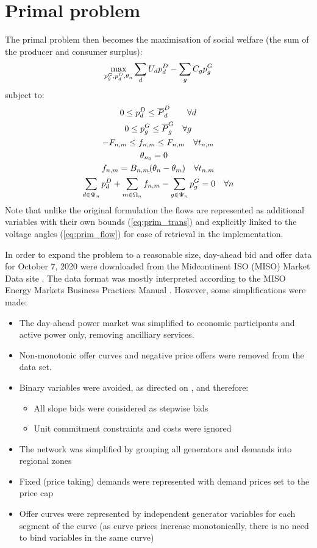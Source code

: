 \documentclass[11pt,a4paper]{article}
\numberwithin{equation}{section}
\begin{document}
\section{Primal problem}
\label{sec:primal}

The primal problem then becomes the maximisation of social welfare (the sum of the producer and consumer surplus):
\begin{equation}
\max_{p^G_g,p^D_d,\theta_n} \sum_d U_d p^D_d - \sum_g C_g p^G_g 
\end{equation}
subject to:
\begin{gather}
0 \leq p^D_d \leq \overline{P}^D_d \quad \quad \forall d \label{eq:prim_demand} \\
0 \leq p^G_g \leq \overline{P}^G_g \quad \forall g \label{eq:prim_supply} \\
-F_{n,m}  \leq f_{n,m} \leq F_{n,m} \quad \forall t_{n,m} \label{eq:prim_trans}\\
\theta_{n_0} = 0 \quad \label{eq:prim_ref_theta} \\
f_{n,m} = B_{n,m}(\theta_n - \theta_m) \quad \forall t_{n,m} \label{eq:prim_flow} \\
\sum_{d \in \Psi_n} p^D_d + \sum_{m \in \Omega_n} f_{n,m} - \sum_{g \in \Psi_n} p^G_g = 0 \quad \forall n \label{eq:prim_balance}
\end{gather}
Note that unlike the original formulation the flows are represented as additional variables with their own bounds (\cref{eq:prim_trans}) and explicitly linked to the voltage angles (\cref{eq:prim_flow}) for ease of retrieval in the implementation.

In order to expand the problem to a reasonable size, day-ahead bid and offer data for October 7, 2020 were downloaded from the Midcontinent ISO (MISO) Market Data site \cite{MISOMarketData}.
The data format was mostly interpreted according to the MISO Energy Markets Business Practices Manual \cite{MISOEnergyOperating2020}. However, some simplifications were made:
\begin{itemize}
\item The day-ahead power market was simplified to economic participants and active power only, removing ancilliary services.
\item Non-monotonic offer curves and negative price offers were removed from the data set.
\item Binary variables were avoided, as directed on \cite[p. 14]{kazempourLectureMarketClearing2021}, and therefore: 
\begin{itemize}
\item All slope bids were considered as stepwise bids
\item Unit commitment constraints and costs were ignored
\end{itemize}
\item The network was simplified by grouping all generators and demands into regional zones
\item Fixed (price taking) demands were represented with demand prices set to the price cap
\item Offer curves were represented by independent generator variables for each segment of the curve (as curve prices increase monotonically, there is no need to bind variables in the same curve)
\end{itemize}
\end{document}
